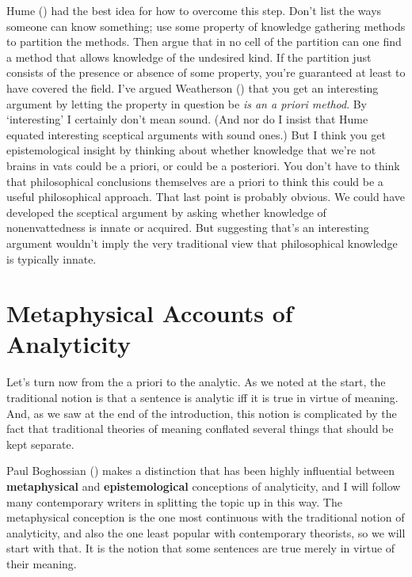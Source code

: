 \documentclass[
  11pt,
  letterpaper,
  DIV=11,
  numbers=noendperiod,
  twoside]{scrartcl}
\begin{document}
Hume () had the best idea for how
to overcome this step. Don't list the ways someone can know something;
use some property of knowledge gathering methods to partition the
methods. Then argue that in no cell of the partition can one find a
method that allows knowledge of the undesired kind. If the partition
just consists of the presence or absence of some property, you're
guaranteed at least to have covered the field. I've argued Weatherson
() that you get an interesting
argument by letting the property in question be \emph{is an a priori
method}. By `interesting' I certainly don't mean sound. (And nor do I
insist that Hume equated interesting sceptical arguments with sound
ones.) But I think you get epistemological insight by thinking about
whether knowledge that we're not brains in vats could be a priori, or
could be a posteriori. You don't have to think that philosophical
conclusions themselves are a priori to think this could be a useful
philosophical approach. That last point is probably obvious. We could
have developed the sceptical argument by asking whether knowledge of
nonenvattedness is innate or acquired. But suggesting that's an
interesting argument wouldn't imply the very traditional view that
philosophical knowledge is typically innate.

\section{Metaphysical Accounts of
Analyticity}\label{metaphysicalaccountsofanalyticity}

Let's turn now from the a priori to the analytic. As we noted at the
start, the traditional notion is that a sentence is analytic iff it is
true in virtue of meaning. And, as we saw at the end of the
introduction, this notion is complicated by the fact that traditional
theories of meaning conflated several things that should be kept
separate.

Paul Boghossian () makes a
distinction that has been highly influential between
\textbf{metaphysical} and \textbf{epistemological} conceptions of
analyticity, and I will follow many contemporary writers in splitting
the topic up in this way. The metaphysical conception is the one most
continuous with the traditional notion of analyticity, and also the one
least popular with contemporary theorists, so we will start with that.
It is the notion that some sentences are true merely in virtue of their
meaning.
\end{document}
